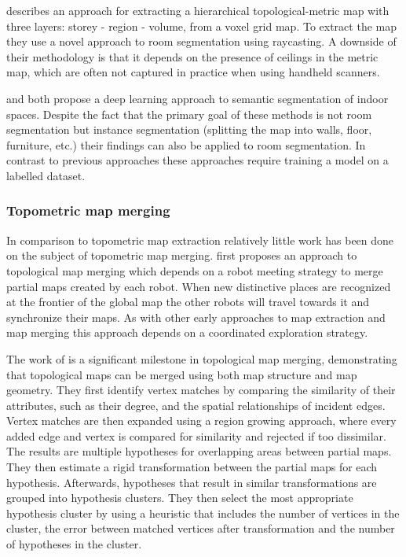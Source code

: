 \citet{he_hierarchical_2021} describes an approach for extracting a hierarchical topological-metric map with three layers: storey - region - volume, from a voxel grid map. To extract the map they use a novel approach to room segmentation using raycasting. A downside of their methodology is that it depends on the presence of ceilings in the metric map, which are often not captured in practice when using handheld scanners. 

\citet{ma_semantic_2020} and \citet{tang_bim_2022} both propose a deep learning approach to semantic segmentation of indoor spaces. Despite the fact that the primary goal of these methods is not room segmentation but instance segmentation (splitting the map into walls, floor, furniture, etc.) their findings can also be applied to room segmentation. In contrast to previous approaches these approaches require training a model on a labelled dataset.

\subsubsection{Topometric map merging}
In comparison to topometric map extraction relatively little work has been done on the subject of topometric map merging. \citet{dudek_topological_1998} first proposes an approach to topological map merging which depends on a robot meeting strategy to merge partial maps created by each robot. When new distinctive places are recognized at the frontier of the global map the other robots will travel towards it and synchronize their maps. As with other early approaches to map extraction and map merging this approach depends on a coordinated exploration strategy.

The work of \citet{huang_topological_2005} is a significant milestone in topological map merging, demonstrating that topological maps can be merged using both map structure and map geometry. They first identify vertex matches by comparing the similarity of their attributes, such as their degree, and the spatial relationships of incident edges. Vertex matches are then expanded using a region growing approach, where every added edge and vertex is compared for similarity and rejected if too dissimilar. The results are multiple hypotheses for overlapping areas between partial maps. They then estimate a rigid transformation between the partial maps for each hypothesis. Afterwards, hypotheses that result in similar transformations are grouped into hypothesis clusters. They then select the most appropriate hypothesis cluster by using a heuristic that includes the number of vertices in the cluster, the error between matched vertices after transformation and the number of hypotheses in the cluster.

